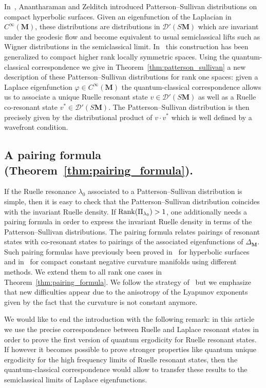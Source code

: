 \documentclass[10pt]{amsart}
\theoremstyle{definition}
\newcommand{\bfm}{\mathbf{M}}
\newcommand{\la}{\lambda}
\begin{document}
In~\cite{AZ07}, Anantharaman and Zelditch introduced Patterson--Sullivan distributions on compact hyperbolic surfaces. Given an eigenfunction of the Laplacian in $C^ \infty(\mathbf M)$, these distributions are distributions in $\mathcal D'(S\mathbf M)$ which are invariant under the geodesic flow and become equivalent to usual semiclassical lifts such as Wigner distributions in the semiclassical limit. In~\cite{HHS12} this construction has been generalized to compact higher rank locally symmetric spaces. Using the quantum-classical correspondence we give in Theorem~\ref{thm:patterson_sullivan} a new description of these Patterson--Sullivan distributions for rank one spaces: given a Laplace eigenfunction $\varphi\in C^ \infty(\mathbf M)$ the quantum-classical correspondence allows us to associate a unique Ruelle resonant state $v\in \mathcal D'(S\mathbf M)$ as well as a Ruelle co-resonant state $v^* \in\mathcal D'(S\mathbf M)$. The Patterson--Sullivan distribution is then precisely given by the distributional product of $v\cdot v^*$ which is well defined by a wavefront condition.



\subsection{A pairing formula (Theorem~\ref{thm:pairing_formula}).}
If the Ruelle resonance $\la_0$ associated to a Patterson--Sullivan distribution is simple, then it is easy to check that the Patterson--Sullivan distribution coincides with the invariant Ruelle density. If ${\rm Rank}(\Pi_{\la_0})>1$, one additionally needs a pairing formula in order to express the invariant Ruelle density in terms of the Patterson--Sullivan distributions. The pairing formula relates pairings of resonant states with co-resonant states to pairings of the associated eigenfunctions of $\Delta_{\bfm}$. Such pairing formulas have previously been proved in~\cite{AZ07} for hyperbolic surfaces and in~\cite{DFG15} for compact constant negative curvature manifolds using different methods. We extend them to all rank one cases in Theorem~\ref{thm:pairing_formula}. We follow the strategy of~\cite{DFG15} but we emphasize that new difficulties appear due to the anisotropy of the Lyapunov exponents given by the fact that the curvature is not constant anymore.

We would like to end the introduction with the following remark: in this article we use the precise correspondence between Ruelle and Laplace resonant states in order to prove the first version of quantum ergodicity for Ruelle resonant states. If however it becomes possible to prove stronger properties like quantum unique ergodicity for the high frequency limits of Ruelle resonant states, then the quantum-classical correspondence would allow to transfer these results to the semiclassical limits of Laplace eigenfunctions.
\end{document}
